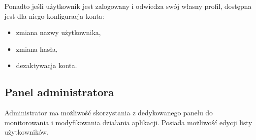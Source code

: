 \documentclass[11pt]{article}
\begin{document}
  Ponadto jeśli użytkownik jest zalogowany i odwiedza swój własny profil, dostępna jest dla niego konfiguracja konta:

  \begin{itemize}
    \item zmiana nazwy użytkownika,
    \item zmiana hasła,
    \item dezaktywacja konta.
  \end{itemize}

  \subsection{Panel administratora}
  Administrator ma możliwość skorzystania z dedykowanego panelu do monitorowania i modyfikowania działania aplikacji. Posiada możliwość edycji listy użytkowników.
\end{document}
